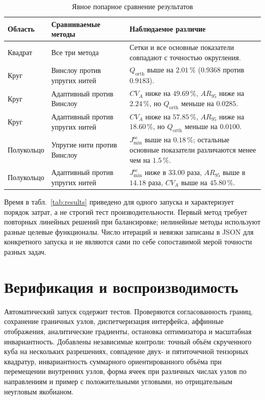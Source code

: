 \documentclass[11pt,a4paper]{article}
\newcommand{\Jsc}{J_{\min}^{\mathrm{sc}}}
\begin{document}
\begin{table}[H]
\centering
\caption{Явное попарное сравнение результатов}
\label{tab:pairwise}
\small
\renewcommand{\arraystretch}{1.13}
\begin{tabular}{
  >{\raggedright\arraybackslash}p{22mm}
  >{\raggedright\arraybackslash}p{44mm}
  >{\raggedright\arraybackslash}p{85mm}}
\toprule
Область & Сравниваемые методы & Наблюдаемое различие \\
\midrule
Квадрат & Все три метода &
Сетки и все основные показатели совпадают с точностью округления. \\
Круг & Винслоу против упругих нитей &
\(Q_{\mathrm{orth}}\) выше на \(2.01\,\%\)
(\(0.9368\) против \(0.9183\)). \\
Круг & Адаптивный против Винслоу &
\(CV_A\) ниже на \(49.69\,\%\), \(AR_{95}\) ниже на \(2.24\,\%\),
но \(Q_{\mathrm{orth}}\) меньше на \(0.0285\). \\
Круг & Адаптивный против упругих нитей &
\(CV_A\) ниже на \(57.85\,\%\), \(AR_{95}\) ниже на \(18.60\,\%\),
но \(Q_{\mathrm{orth}}\) меньше на \(0.0100\). \\
Полукольцо & Упругие нити против Винслоу &
\(\Jsc\) выше на \(0.18\,\%\); остальные основные показатели
различаются менее чем на \(1.5\,\%\). \\
Полукольцо & Адаптивный против упругих нитей &
\(\Jsc\) ниже в \(33.00\) раза, \(AR_{95}\) выше в \(14.18\) раза,
\(CV_A\) выше на \(45.80\,\%\). \\
\bottomrule
\end{tabular}
\end{table}

Время в табл.~\ref{tab:results} приведено для одного запуска и
характеризует порядок затрат, а не строгий тест производительности.
Первый метод требует повторных линейных решений при балансировке;
нелинейные методы используют разные целевые функционалы. Число итераций
и невязки записаны в JSON для конкретного запуска и не являются сами по
себе сопоставимой мерой точности разных задач.

\section{Верификация и воспроизводимость}

Автоматический запуск содержит \AuditTestCount{} тестов. Проверяются
согласованность границ, сохранение граничных узлов, диспетчеризация
интерфейса, аффинные отображения, аналитические градиенты, остановка
оптимизатора и масштабная инвариантность. Добавлены независимые контроли:
точный объём скрученного куба на нескольких разрешениях, совпадение
двух- и пятиточечной тензорных квадратур, инвариантность суммарного
ориентированного объёма при перемещении внутренних узлов, форма ячеек
при различных числах узлов по направлениям и пример с положительными
угловыми, но отрицательным неугловым якобианом.
\end{document}
